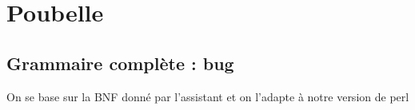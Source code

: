\documentclass[a4paper,10pt]{article}
\begin{document}
\pagebreak

\section{Poubelle}

\subsection{Grammaire complète : bug}

On se base sur la BNF donné par l'assistant et on l'adapte à notre version de perl
\end{document}
